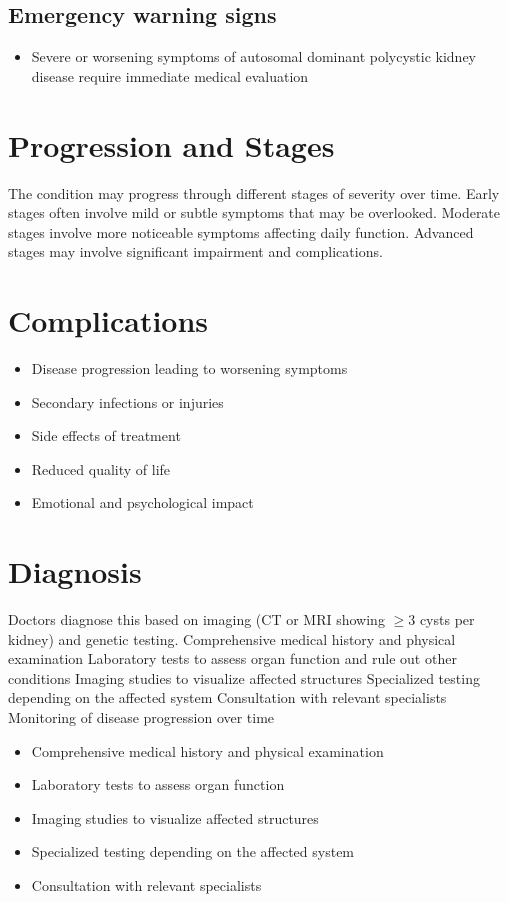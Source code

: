 \subsection{Emergency warning signs}
\begin{itemize}[noitemsep]
  \item Severe or worsening symptoms of autosomal dominant polycystic kidney disease require immediate medical evaluation
\end{itemize}
\section{Progression and Stages}
The condition may progress through different stages of severity over time. Early stages often involve mild or subtle symptoms that may be overlooked. Moderate stages involve more noticeable symptoms affecting daily function. Advanced stages may involve significant impairment and complications.
\section{Complications}
\begin{itemize}[noitemsep]
  \item Disease progression leading to worsening symptoms
  \item Secondary infections or injuries
  \item Side effects of treatment
  \item Reduced quality of life
  \item Emotional and psychological impact
\end{itemize}
\section{Diagnosis}
Doctors diagnose this based on imaging (CT or MRI showing $\geq$3 cysts per kidney) and genetic testing. Comprehensive medical history and physical examination Laboratory tests to assess organ function and rule out other conditions Imaging studies to visualize affected structures Specialized testing depending on the affected system Consultation with relevant specialists Monitoring of disease progression over time

\begin{itemize}[noitemsep]
  \item Comprehensive medical history and physical examination
  \item Laboratory tests to assess organ function
  \item Imaging studies to visualize affected structures
  \item Specialized testing depending on the affected system
  \item Consultation with relevant specialists
\end{itemize}

